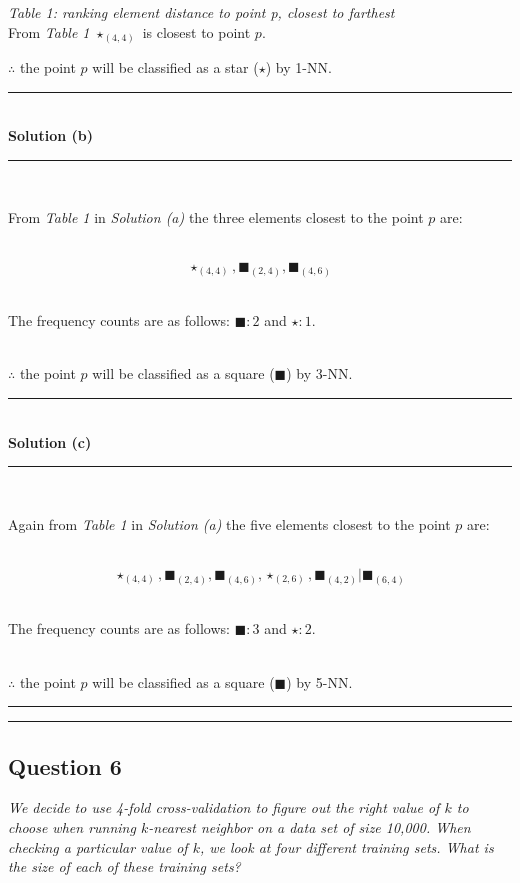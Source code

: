 \documentclass{article}
\begin{document}
\textit{Table 1: ranking element distance to point p, closest to farthest}\\

From \textit{Table 1} $\star_{(4,4)}$ is closest to point $p$.

$\therefore$ the point $p$ will be classified as a star ($\star$) by 1-NN.

\noindent\rule{\textwidth}{0.4pt}\\  

\textbf{Solution (b)} 

\noindent\rule{\textwidth}{0.4pt}\\

\parbox{\textwidth}{From \textit{Table 1} in \textit{Solution (a)} the three elements closest to the point $p$ are:}\\ 

$$\star_{(4,4)} ,\blacksquare_{(2,4)} ,\blacksquare_{(4,6)}$$\\ 

\parbox{\textwidth}{The frequency counts are as follows: $\blacksquare : 2$ and $\star : 1$.}\\

$\therefore$ the point $p$ will be classified as a square ($\blacksquare$) by 3-NN.

\noindent\rule{\textwidth}{0.4pt}\\
\newpage
\textbf{Solution (c)} 

\noindent\rule{\textwidth}{0.4pt}\\

\parbox{\textwidth}{Again from \textit{Table 1} in \textit{Solution (a)} the five elements closest to the point $p$ are:}\\

$$\star_{(4,4)} ,\blacksquare_{(2,4)} ,\blacksquare_{(4,6)} ,\star_{(2,6)} ,\blacksquare_{(4,2)} | \blacksquare_{(6,4)}$$ \\

\parbox{\textwidth}{The frequency counts are as follows: $\blacksquare : 3$ and $\star : 2$.}\\

$\therefore$ the point $p$ will be classified as a square ($\blacksquare$) by 5-NN.

\noindent\rule{\textwidth}{0.4pt}

\noindent\rule{\textwidth}{0.4pt}

\subsection*{Question 6}
\textit{We decide to use 4-fold cross-validation to figure out the right value of $k$ to choose when running $k$-nearest neighbor on a data set of size 10,000. When checking a particular value of $k$, we look at four different training sets. What is the size of each of these training sets?}\\
\end{document}
